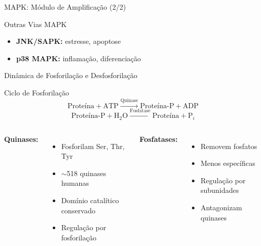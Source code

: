 \begin{frame}[shrink=10]{MAPK: Módulo de Amplificação (2/2)}
\begin{exampleblock}{Outras Vias MAPK}
\begin{itemize}
    \item \textbf{JNK/SAPK:} estresse, apoptose
    \item \textbf{p38 MAPK:} inflamação, diferenciação
\end{itemize}
\end{exampleblock}

\end{frame}

\begin{frame}[shrink=10]{Dinâmica de Fosforilação e Desfosforilação}
\begin{block}{Ciclo de Fosforilação}
\begin{equation*}
\text{Proteína} + \text{ATP} \xrightarrow{\text{Quinase}} \text{Proteína-P} + \text{ADP}
\end{equation*}
\begin{equation*}
\text{Proteína-P} + \text{H}_2\text{O} \xrightarrow{\text{Fosfatase}} \text{Proteína} + \text{P}_i
\end{equation*}
\end{block}

\vspace{0.3cm}

\begin{columns}
\textbf{Quinases:}
\begin{itemize}
    \item Fosforilam Ser, Thr, Tyr
    \item $\sim$518 quinases humanas
    \item Domínio catalítico conservado
    \item Regulação por fosforilação
\end{itemize}

\textbf{Fosfatases:}
\begin{itemize}
    \item Removem fosfatos
    \item Menos específicas
    \item Regulação por subunidades
    \item Antagonizam quinases
\end{itemize}
\end{columns}

\vspace{0.3cm}

\end{frame}

